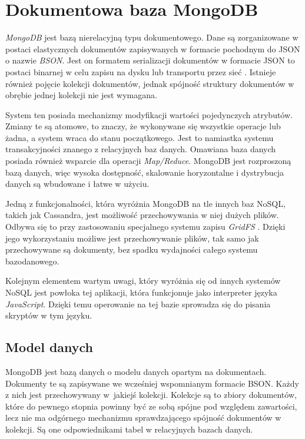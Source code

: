 \section{Dokumentowa baza MongoDB}

\textit{MongoDB} jest bazą nierelacyjną typu dokumentowego.
Dane są zorganizowane w postaci elastycznych dokumentów zapisywanych w formacie pochodnym do JSON o nazwie \textit{BSON}.
Jest on formatem serializacji dokumentów w formacie JSON to postaci binarnej w celu zapisu na dysku lub transportu przez sieć \cite{BSONSpecification}.
Istnieje również pojęcie kolekcji dokumentów, jednak spójność struktury dokumentów w obrębie jednej kolekcji nie jest wymagana.

System ten posiada mechanizmy modyfikacji wartości pojedynczych atrybutów.
Zmiany te są atomowe, to znaczy, że wykonywane się wszystkie operacje lub żadna, a system wraca do stanu początkowego.
Jest to namiastka systemu transakcyjności znanego z relacyjnych baz danych.
Omawiana baza danych posiada również wsparcie dla operacji \textit{Map/Reduce}. 
MongoDB jest rozproszoną bazą danych, więc wysoka dostępność, skalowanie horyzontalne i dystrybucja danych są wbudowane i łatwe w użyciu.

Jedną z funkcjonalności, która wyróżnia MongoDB na tle innych baz NoSQL, takich jak Cassandra, jest możliwość przechowywania w niej dużych plików.
Odbywa się to przy zastosowaniu specjalnego systemu zapisu \textit{GridFS} \cite{GridFSManual}.
Dzięki jego wykorzystaniu możliwe jest przechowywanie plików, tak samo jak przechowywane są dokumenty, bez spadku wydajności całego systemu bazodanowego.

Kolejnym elementem wartym uwagi, który wyróżnia się od innych systemów NoSQL jest powłoka tej aplikacji, która funkcjonuje jako interpreter języka \textit{JavaScript}.
Dzięki temu operowanie na tej bazie sprowadza się do pisania skryptów w tym języku.

\subsection{Model danych} \label{sec:MongoModelDanych}

MongoDB jest bazą danych o modelu danych opartym na dokumentach.
Dokumenty te są zapisywane we wcześniej wspomnianym formacie BSON.
Każdy z nich jest przechowywany w~jakiejś kolekcji.
Kolekcje są to zbiory dokumentów, które do pewnego stopnia powinny być ze sobą spójne pod względem zawartości, lecz nie ma odgórnego mechanizmu sprawdzającego spójność dokumentów w kolekcji.
Są one odpowiednikami tabel w relacyjnych bazach danych.

